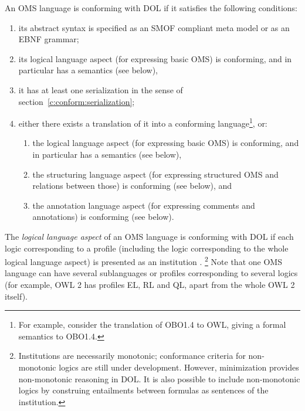 \documentclass[10pt,fleqn,%
\ifpretendfinal
final%
\else
draft%
\fi,
]{scrreprt}
\begin{document}
An OMS language is conforming with DOL if it satisfies the following conditions:
\begin{enumerate}
\item its abstract syntax is specified as an SMOF compliant meta model
or as an EBNF grammar;
\item its logical language aspect (for expressing basic OMS) is conforming,
 and in particular has a semantics (see below),
\item it has at least one serialization in the sense of section~\ref{c:conform:serialization};
\item either there exists a translation of it into a conforming
  language\footnote {For example, consider the translation of OBO1.4
    to OWL, giving a formal semantics to OBO1.4.}, or:
\begin{enumerate}
\item the logical language aspect (for expressing basic OMS) is conforming, and in particular has a semantics (see below),
\item  the structuring language aspect (for expressing structured OMS and relations
between those) is conforming (see below), and
\item the annotation language aspect (for expressing comments and annotations)
is conforming (see below).
\end{enumerate}
\end{enumerate}


The \emph{logical language aspect} of an OMS language
is %
conforming with DOL if each logic corresponding to a profile (including
the logic corresponding to the whole logical language aspect) is presented as an
institution \cite{GoguenBurstall92}.
\footnote{Institutions are necessarily monotonic; conformance criteria for non-monotonic logics are
still under development. However, minimization provides non-monotonic reasoning in DOL. It is also possible to include non-monotonic logics by construing entailments between formulas as sentences of the institution.} Note that one OMS language can have several sublanguages or profiles 
corresponding to several logics (for example, OWL 2 has profiles EL, RL and QL, apart from the
whole OWL 2 itself).
\end{document}
